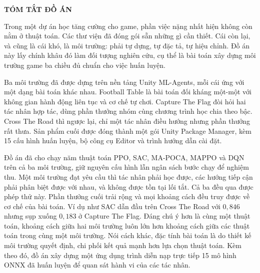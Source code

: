 \fontsize{13pt}{22.5pt}\selectfont
\begin{center}
    {\large\bfseries TÓM TẮT ĐỒ ÁN}
\end{center}

\vspace{0.5cm}

\indent Trong một dự án học tăng cường cho game, phần việc nặng nhất hiện không còn nằm ở
thuật toán. Các thư viện đã đóng gói sẵn những gì cần thiết. Cái còn lại, và cũng là cái
khó, là môi trường: phải tự dựng, tự đặc tả, tự hiệu chỉnh. Đồ án này lấy chính khâu đó
làm đối tượng nghiên cứu, cụ thể là bài toán xây dựng môi trường game ba chiều đủ chuẩn
cho việc huấn luyện.

\indent Ba môi trường đã được dựng trên nền tảng Unity ML-Agents, mỗi cái ứng với một
dạng bài toán khác nhau. Football Table là bài toán đối kháng một-một với không gian hành
động liên tục và cơ chế tự chơi. Capture The Flag đòi hỏi hai tác nhân hợp tác, dùng phần
thưởng nhóm cùng chương trình học chia theo bậc. Cross The Road thì ngược lại, chỉ một tác
nhân điều hướng nhưng phần thưởng rất thưa. Sản phẩm cuối được đóng thành một gói
Unity Package Manager, kèm 15 cấu hình huấn luyện, bộ công cụ Editor và trình hướng dẫn
cài đặt.

\indent Đồ án đã cho chạy năm thuật toán PPO, SAC, MA-POCA, MAPPO và DQN trên cả ba môi trường, giữ nguyên cấu hình lẫn ngân sách bước chạy để nghiệm thu. Một môi trường đạt yêu cầu thì tác nhân phải học được, các hướng
tiếp cận phải phân biệt được với nhau, và không được tồn tại lối tắt. Cả ba đều qua được
phép thử này. Phần thưởng cuối trải rộng và mọi khoảng cách đều truy được về cơ chế của
bài toán. Ví dụ như SAC dẫn đầu trên Cross The Road với $0{,}846$ nhưng sụp xuống
$0{,}183$ ở Capture The Flag. Đáng chú ý hơn là cùng một thuật toán, khoảng cách
giữa hai môi trường luôn lớn hơn khoảng cách giữa các thuật toán trong cùng một môi
trường. Nói cách khác, đặc tính bài toán là do thiết kế môi trường quyết định, chi
phối kết quả mạnh hơn lựa chọn thuật toán. Kèm theo đó, đồ án xây dựng một ứng dụng trình
diễn nạp trực tiếp 15 mô hình ONNX đã huấn luyện để quan sát hành vi của các tác nhân.

